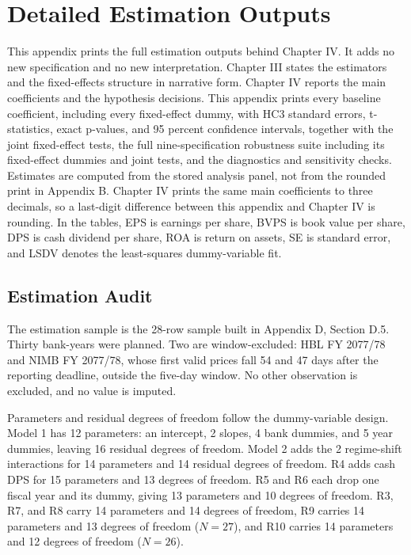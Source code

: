 \chapter{Detailed Estimation Outputs}
\label{app:estimation_outputs}

This appendix prints the full estimation outputs behind Chapter IV. It adds no new specification and no new interpretation. Chapter III states the estimators and the fixed-effects structure in narrative form. Chapter IV reports the main coefficients and the hypothesis decisions. This appendix prints every baseline coefficient, including every fixed-effect dummy, with HC3 standard errors, t-statistics, exact p-values, and 95 percent confidence intervals, together with the joint fixed-effect tests, the full nine-specification robustness suite including its fixed-effect dummies and joint tests, and the diagnostics and sensitivity checks. Estimates are computed from the stored analysis panel, not from the rounded print in Appendix B. Chapter IV prints the same main coefficients to three decimals, so a last-digit difference between this appendix and Chapter IV is rounding. In the tables, EPS is earnings per share, BVPS is book value per share, DPS is cash dividend per share, ROA is return on assets, SE is standard error, and LSDV denotes the least-squares dummy-variable fit.

\section{Estimation Audit}

The estimation sample is the 28-row sample built in Appendix D, Section D.5. Thirty bank-years were planned. Two are window-excluded: HBL FY 2077/78 and NIMB FY 2077/78, whose first valid prices fall 54 and 47 days after the reporting deadline, outside the five-day window. No other observation is excluded, and no value is imputed.

Parameters and residual degrees of freedom follow the dummy-variable design. Model 1 has 12 parameters: an intercept, 2 slopes, 4 bank dummies, and 5 year dummies, leaving 16 residual degrees of freedom. Model 2 adds the 2 regime-shift interactions for 14 parameters and 14 residual degrees of freedom. R4 adds cash DPS for 15 parameters and 13 degrees of freedom. R5 and R6 each drop one fiscal year and its dummy, giving 13 parameters and 10 degrees of freedom. R3, R7, and R8 carry 14 parameters and 14 degrees of freedom, R9 carries 14 parameters and 13 degrees of freedom ($N = 27$), and R10 carries 14 parameters and 12 degrees of freedom ($N = 26$).

